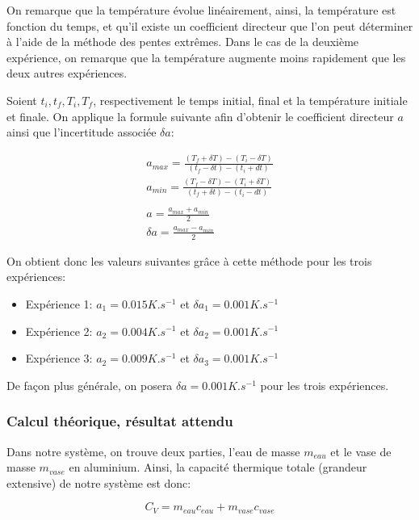 \documentclass[12pt]{article}
\begin{document}
On remarque que la température évolue linéairement, ainsi, la température est fonction du temps, et qu'il existe un coefficient directeur que l'on peut déterminer à l'aide de la méthode des pentes extrêmes.
Dans le cas de la deuxième expérience, on remarque que la température augmente moins rapidement que les deux autres expériences. 

Soient $t_i, t_f, T_i, T_f$, respectivement le temps initial, final et la température initiale et finale. On applique la formule suivante afin d'obtenir le coefficient directeur $a$ ainsi que l'incertitude associée $\delta a$:

\begin{gather*}
	a_{max} = \frac{(T_f + \delta T) - (T_i - \delta T)}{(t_f - \delta t) - (t_i + dt)} \\
	a_{min} = \frac{(T_f - \delta T) - (T_i + \delta T)}{(t_f + \delta t) - (t_i - dt)} \\
	\\
	a = \frac{a_{max} + a_{min}}{2} \\
	\delta a = \frac{a_{max} - a_{min}}{2}
\end{gather*}

On obtient donc les valeurs suivantes grâce à cette méthode pour les trois expériences:
\begin{itemize}
	\item Expérience 1: $a_1 = 0.015 K.s^{-1}$ et $\delta a_1 = 0.001 K.s^{-1}$
	\item Expérience 2: $a_2 = 0.004 K.s^{-1}$ et $\delta a_2 = 0.001 K.s^{-1}$
	\item Expérience 3: $a_2 = 0.009 K.s^{-1}$ et $\delta a_3 = 0.001 K.s^{-1}$
\end{itemize}

De façon plus générale, on posera $\delta a = 0.001 K.s^{-1}$ pour les trois expériences.

\newpage
\subsubsection{Calcul théorique, résultat attendu}

Dans notre système, on trouve deux parties, l'eau de masse $m_{eau}$ et le vase de masse $m_{vase}$ en aluminium. Ainsi, la capacité thermique totale (grandeur extensive) de notre système est donc:

\begin{equation}
	C_V = m_{eau}c_{eau}+ m_{vase} c_{vase}
\end{equation}
\end{document}
